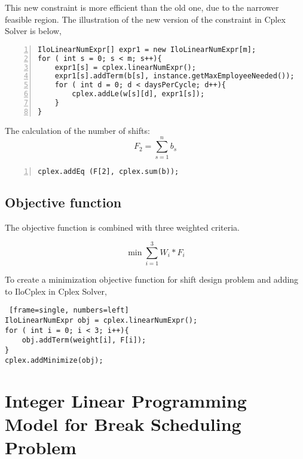 This new constraint is more efficient than the old one, due to the narrower feasible region. The illustration of the new version of the constraint in Cplex Solver is below,


\begin{lstlisting}[frame=single, numbers=left]
IloLinearNumExpr[] expr1 = new IloLinearNumExpr[m];
for ( int s = 0; s < m; s++){
    expr1[s] = cplex.linearNumExpr();
    expr1[s].addTerm(b[s], instance.getMaxEmployeeNeeded()); 
    for ( int d = 0; d < daysPerCycle; d++){
        cplex.addLe(w[s][d], expr1[s]);
    }
}
\end{lstlisting}

The calculation of the number of shifts:
\begin{equation}
F_2 = \sum_{s=1}^n b_s
\end{equation}

\begin{lstlisting}[frame=single, numbers=left]
	cplex.addEq (F[2], cplex.sum(b));
\end{lstlisting}


\subsection{Objective function}
The objective function is combined with three weighted criteria.

\begin{equation}
\min \sum_{i=1}^3 W_i * F_i
\end{equation}

To create a minimization objective function  for shift design problem and adding to IloCplex in Cplex Solver,

\begin{lstlisting} [frame=single, numbers=left]
IloLinearNumExpr obj = cplex.linearNumExpr();
for ( int i = 0; i < 3; i++){
    obj.addTerm(weight[i], F[i]);
}
cplex.addMinimize(obj);

\end{lstlisting}










\section{Integer Linear Programming Model for Break Scheduling Problem}

